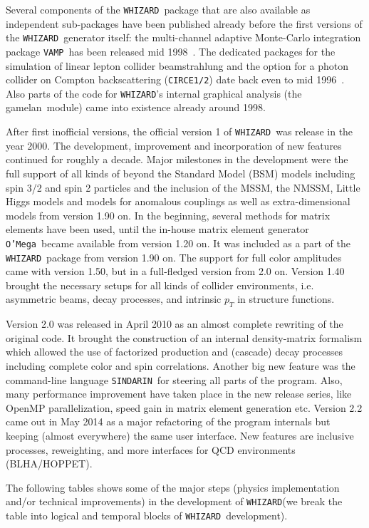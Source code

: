 \documentclass[12pt]{book}
\newcommand{\ttt}[1]{\texttt{#1}}
\newcommand{\whizard}{\ttt{WHIZARD}}
\newcommand{\oMega}{\ttt{O'Mega}}
\newcommand{\vamp}{\ttt{VAMP}}
\newcommand{\gamelan}{\textsf{gamelan}}
\newcommand{\sindarin}{\ttt{SINDARIN}}
\begin{document}
Several components of the \whizard\ package that are also available as
independent sub-packages have been published already before the first
versions of the \whizard\ generator itself: the multi-channel adaptive
Monte-Carlo integration package \vamp\ has been released mid
1998~\cite{VAMP}. The dedicated packages for the simulation of linear
lepton collider beamstrahlung and the option for a photon collider on
Compton backscattering (\ttt{CIRCE1/2}) date back even to mid
1996~\cite{CIRCE}. Also parts of the code for \whizard's internal
graphical analysis (the \gamelan\ module) came into existence already
around 1998.

After first inofficial versions, the official version 1 of \whizard\
was release in the year 2000. The development, improvement and
incorporation of new features continued for roughly a decade. Major
milestones in the development were the full support of all kinds of
beyond the Standard Model (BSM) models including spin 3/2 and spin 2
particles and the inclusion of the MSSM, the NMSSM, Little Higgs
models and models for anomalous couplings as well as extra-dimensional
models from version 1.90 on. In the beginning, several methods for
matrix elements have been used, until the in-house matrix element
generator \oMega\ became available from version 1.20 on. It was
included as a part of the \whizard\ package from version 1.90 on. The
support for full color amplitudes came with version 1.50, but in a
full-fledged version from 2.0 on. Version 1.40 brought the necessary
setups for all kinds of collider environments, i.e. asymmetric beams,
decay processes, and intrinsic $p_T$ in structure functions.

Version 2.0 was released in April 2010 as an almost complete rewriting
of the original code. It brought the construction of an internal
density-matrix formalism which allowed the use of factorized
production and (cascade) decay processes including complete color and
spin correlations. Another big new feature was the command-line
language \sindarin\ for steering all parts of the program. Also, many
performance improvement have taken place in the new release series,
like OpenMP parallelization, speed gain in matrix element generation
etc. Version 2.2 came out in May 2014 as a major refactoring of the
program internals but keeping (almost everywhere) the same user
interface. New features are inclusive processes, reweighting, and more
interfaces for QCD environments (BLHA/HOPPET).

The following tables shows some of the major steps (physics
implementation and/or technical improvements) in the development
of \whizard (we break the table into logical and temporal blocks of
\whizard\ development).
\end{document}
